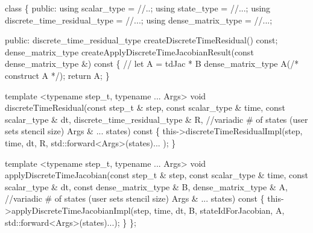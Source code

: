  
\begin{DoxyCode}
\textcolor{keyword}{class}
\{
\textcolor{keyword}{public}:
  \textcolor{keyword}{using} scalar\_type = \textcolor{comment}{//..;}
  \textcolor{keyword}{using} state\_type  = \textcolor{comment}{//...;}
  \textcolor{keyword}{using} discrete\_time\_residual\_type = \textcolor{comment}{//...;}
  \textcolor{keyword}{using} dense\_matrix\_type = \textcolor{comment}{//...;}

\textcolor{keyword}{public}:
  discrete\_time\_residual\_type createDiscreteTimeResidual() \textcolor{keyword}{const};
  dense\_matrix\_type createApplyDiscreteTimeJacobianResult(\textcolor{keyword}{const} dense\_matrix\_type &)\textcolor{keyword}{ const}
\textcolor{keyword}{  }\{ \textcolor{comment}{// let A =  tdJac * B}
    dense\_matrix\_type A(\textcolor{comment}{/* construct A */});
    \textcolor{keywordflow}{return} A;
  \}

  \textcolor{keyword}{template} <\textcolor{keyword}{typename} step\_t, \textcolor{keyword}{typename} ... Args>
  \textcolor{keywordtype}{void} discreteTimeResidual(\textcolor{keyword}{const} step\_t & step,
            \textcolor{keyword}{const} scalar\_type & time,
            \textcolor{keyword}{const} scalar\_type & dt,
            discrete\_time\_residual\_type & R,
              \textcolor{comment}{//variadic # of states (user sets stencil size)}
            Args & ... states)\textcolor{keyword}{ const}
\textcolor{keyword}{  }\{
    this->discreteTimeResidualImpl(step, time, dt, R, std::forward<Args>(states)... );
  \}

  \textcolor{keyword}{template} <\textcolor{keyword}{typename} step\_t, \textcolor{keyword}{typename} ... Args>
  \textcolor{keywordtype}{void} applyDiscreteTimeJacobian(\textcolor{keyword}{const} step\_t & step,
           \textcolor{keyword}{const} scalar\_type & time,
           \textcolor{keyword}{const} scalar\_type & dt,
           \textcolor{keyword}{const} dense\_matrix\_type & B,
           dense\_matrix\_type & A,
             \textcolor{comment}{//variadic # of states (user sets stencil size)}
           Args & ... states)\textcolor{keyword}{ const}
\textcolor{keyword}{  }\{
    this->applyDiscreteTimeJacobianImpl(step, time, dt, B, stateIdForJacobian,
                    A, std::forward<Args>(states)...);
  \}
\};
\end{DoxyCode}
 